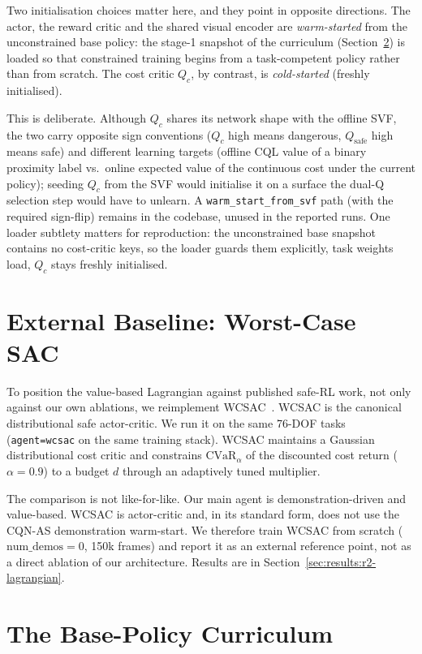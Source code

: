 \documentclass[11pt,a4paper]{report}
\newcommand{\cvar}{\ensuremath{\mathrm{CVaR}}}
\newcommand{\cqnas}{CQN-AS}
\begin{document}
Two initialisation choices matter here, and they point in opposite
directions. The actor, the reward critic and the shared visual encoder
are \emph{warm-started} from the unconstrained base policy: the
stage-1 snapshot of the curriculum
(Section~\ref{sec:method:curriculum}) is loaded so that constrained
training begins from a task-competent policy rather than from scratch.
The cost critic $Q_c$, by contrast, is \emph{cold-started} (freshly
initialised).

This is deliberate. Although $Q_c$ shares its network shape with the
offline SVF, the two carry opposite sign conventions ($Q_c$ high
means dangerous, $Q_{\mathrm{safe}}$ high means safe) and different
learning targets (offline CQL value of a binary proximity label vs.\
online expected value of the continuous cost under the current
policy); seeding $Q_c$ from the SVF would initialise it on a surface
the dual-Q selection step would have to unlearn. A
\texttt{warm\_start\_from\_svf} path (with the required sign-flip)
remains in the codebase, unused in the reported runs. One loader
subtlety matters for reproduction: the unconstrained base
snapshot contains no cost-critic keys, so the loader guards them
explicitly, task weights load, $Q_c$ stays freshly initialised.


\section{External Baseline: Worst-Case SAC}
\label{sec:method:wcsac}

To position the value-based Lagrangian against published safe-RL work,
not only against our own ablations, we reimplement
WCSAC~\cite{yang2021wcsac}. WCSAC is the
canonical distributional safe actor-critic. We run it on the same
76-DOF tasks (\texttt{agent=wcsac} on the same training stack). WCSAC
maintains a Gaussian distributional cost critic and constrains
$\cvar_{\alpha}$ of the discounted cost return ($\alpha = 0.9$) to a
budget $d$ through an adaptively tuned multiplier.

The comparison is not like-for-like. Our main agent is
demonstration-driven and value-based. WCSAC is actor-critic and, in its
standard form, does not use the \cqnas{} demonstration warm-start. We
therefore train WCSAC from scratch
($\text{num\_demos} = 0$, 150k frames) and report it as an external
reference point, not as a direct ablation of our architecture. Results
are in Section~\ref{sec:results:r2-lagrangian}.

\section{The Base-Policy Curriculum}
\label{sec:method:curriculum}
\end{document}
